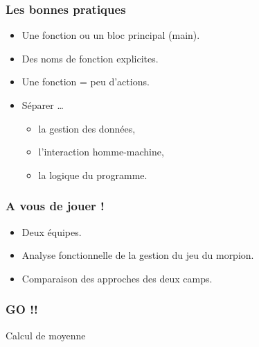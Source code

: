 \documentclass[utf8x, handout]{beamer}
\newcommand{\AFfun}[3]{\tiny \begin{tabular}{lll} #1 \\ \hline IN : #2 \\ OUT : #3 \\ \end{tabular}}
\begin{document}
%
\begin{frame}
  \frametitle{Les bonnes pratiques}
  \begin{itemize}
  \item<+-> Une fonction ou un bloc principal (main).
  \item<+-> Des noms de fonction explicites.
  \item<+-> Une fonction = peu d'actions.
  \item<+-> Séparer \dots
    \begin{itemize}
    \item<+-> la gestion des données,
    \item<+-> l'interaction homme-machine,
    \item<+-> la logique du programme.
    \end{itemize}
  \end{itemize}
\end{frame}
%




%
\begin{frame}
  \frametitle{A vous de jouer !}
  \begin{itemize}
  \item<+-> Deux équipes.
    \bigskip
  \item<+-> Analyse fonctionnelle de la gestion du jeu du morpion.
    \bigskip
  \item<+-> Comparaison des approches des deux camps.
  \end{itemize}
\end{frame}
%


%
\begin{frame}
  \frametitle{GO !!}
  Calcul de moyenne
  \begin{center}
  \end{center}
\end{frame}
%
\end{document}
